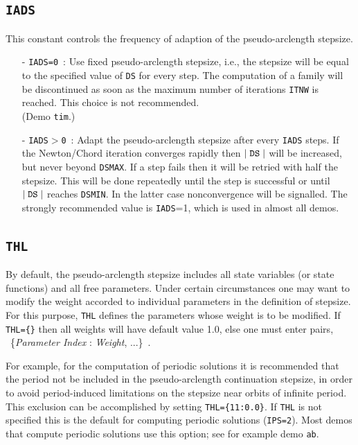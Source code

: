 \documentclass[12pt]{report}
\def\abs#1{\mid#1\mid}
\begin{document}
\subsection{\texttt{IADS}}  \label{sec:IADS}
This constant controls the frequency of adaption of the 
pseudo-arclength stepsize.
\begin{itemize}
\item[-] {\tt IADS=0}~: 
  Use fixed pseudo-arclength stepsize, i.e., the stepsize will
  be equal to the specified value of {\tt DS} for every step.
  The computation of a family will be discontinued as soon as
  the maximum number of iterations {\tt ITNW} is reached.
  This choice is not recommended. \\(Demo {\tt tim}.)
\item[-] {\tt IADS$>$0}~:  
 Adapt the pseudo-arclength stepsize after every {\tt IADS} steps.
  If the Newton/Chord iteration converges rapidly then 
  $\abs{\tt DS}$ will be increased, but never beyond {\tt DSMAX}.
  If a step fails then it will be retried with half
  the stepsize. This will be done repeatedly until the
  step is successful or until $\abs{\tt DS}$ reaches {\tt DSMIN}. 
  In the latter case nonconvergence will be signalled.
  The strongly recommended value is {\tt IADS}=1, which is used in 
  almost all demos.
\end{itemize}
  
\subsection{\texttt{THL}}  \label{sec:THL}
By default, the pseudo-arclength stepsize includes all state variables
(or state functions) and all free parameters.
Under certain circumstances one may want to modify the weight accorded 
to individual parameters in the definition of stepsize.
For this purpose, {\tt THL} defines the parameters whose weight 
is to be modified.
If {\tt THL=\{\}} then all weights will have default value 1.0,
else one must enter pairs,
             ~\{{\it Parameter Index} : {\it Weight}, ...\}~.

For example, for the computation of periodic solutions it is 
recommended that the period not be included in the pseudo-arclength 
continuation stepsize, in order to avoid period-induced limitations 
on the stepsize near orbits of infinite period. 
This exclusion can be accomplished by setting {\tt THL=\{11:0.0\}}.
If {\tt THL} is not specified this is the default for computing
periodic solutions ({\tt IPS=2}).
Most demos that compute periodic solutions use this option;
see for example demo {\tt ab}.
\end{document}
